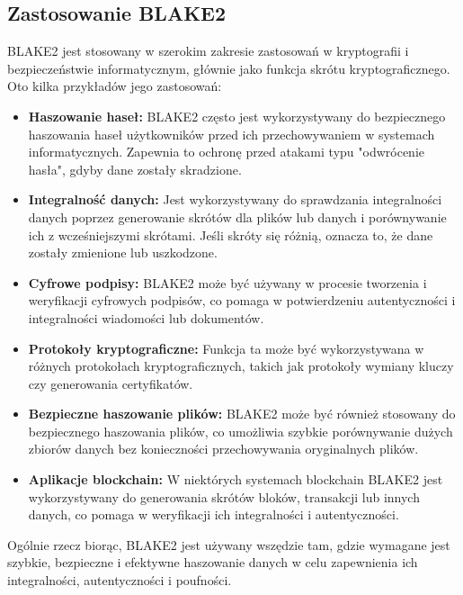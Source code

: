 \documentclass[12pt, a4paper]{article}
\begin{document}
\subsection{Zastosowanie BLAKE2}
BLAKE2 jest stosowany w szerokim zakresie zastosowań w kryptografii i bezpieczeństwie informatycznym, głównie jako funkcja skrótu kryptograficznego. Oto kilka przykładów jego zastosowań:
\begin{itemize}
\item \textbf{Haszowanie haseł:} BLAKE2 często jest wykorzystywany do bezpiecznego haszowania haseł użytkowników przed ich przechowywaniem w systemach informatycznych. Zapewnia to ochronę przed atakami typu "odwrócenie hasła", gdyby dane zostały skradzione.

\item \textbf{Integralność danych:} Jest wykorzystywany do sprawdzania integralności danych poprzez generowanie skrótów dla plików lub danych i porównywanie ich z wcześniejszymi skrótami. Jeśli skróty się różnią, oznacza to, że dane zostały zmienione lub uszkodzone.

\item \textbf{Cyfrowe podpisy:} BLAKE2 może być używany w procesie tworzenia i weryfikacji cyfrowych podpisów, co pomaga w potwierdzeniu autentyczności i integralności wiadomości lub dokumentów.

\item \textbf{Protokoły kryptograficzne:} Funkcja ta może być wykorzystywana w różnych protokołach kryptograficznych, takich jak protokoły wymiany kluczy czy generowania certyfikatów.

\item \textbf{Bezpieczne haszowanie plików:} BLAKE2 może być również stosowany do bezpiecznego haszowania plików, co umożliwia szybkie porównywanie dużych zbiorów danych bez konieczności przechowywania oryginalnych plików.

\item \textbf{Aplikacje blockchain:} W niektórych systemach blockchain BLAKE2 jest wykorzystywany do generowania skrótów bloków, transakcji lub innych danych, co pomaga w weryfikacji ich integralności i autentyczności.
\end{itemize}
Ogólnie rzecz biorąc, BLAKE2 jest używany wszędzie tam, gdzie wymagane jest szybkie, bezpieczne i efektywne haszowanie danych w celu zapewnienia ich integralności, autentyczności i poufności.
\end{document}
